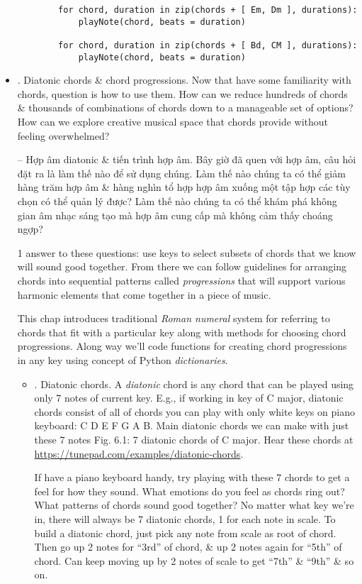 \documentclass{article}
\begin{document}
\begin{itemize}
\begin{verbatim}
		for chord, duration in zip(chords + [ Em, Dm ], durations):
		    playNote(chord, beats = duration)
		    
		for chord, duration in zip(chords + [ Bd, CM ], durations):
		    playNote(chord, beats = duration)
	\end{verbatim}
	\item {. Diatonic chords \& chord progressions.} Now that have some familiarity with chords, question is how to use them. How can we reduce hundreds of chords \& thousands of combinations of chords down to a manageable set of options? How can we explore creative musical space that chords provide without feeling overwhelmed?
	
	-- {\sf Hợp âm diatonic \& tiến trình hợp âm.} Bây giờ đã quen với hợp âm, câu hỏi đặt ra là làm thế nào để sử dụng chúng. Làm thế nào chúng ta có thể giảm hàng trăm hợp âm \& hàng nghìn tổ hợp hợp âm xuống một tập hợp các tùy chọn có thể quản lý được? Làm thế nào chúng ta có thể khám phá không gian âm nhạc sáng tạo mà hợp âm cung cấp mà không cảm thấy choáng ngợp?
	
	1 answer to these questions: use keys to select subsets of chords that we know will sound good together. From there we can follow guidelines for arranging chords into sequential patterns called {\it progressions} that will support various harmonic elements that come together in a piece of music.
	
	This chap introduces traditional {\it Roman numeral} system for referring to chords that fit with a particular key along with methods for choosing chord progressions. Along way we'll code functions for creating chord progressions in any key using concept of Python {\it dictionaries}.
	\begin{itemize}
		\item {. Diatonic chords.} A {\it diatonic} chord is any chord that can be played using only 7 notes of current key. E.g., if working in key of C major, diatonic chords consist of all of chords you can play with only white keys on piano keyboard: C D E F G A B. Main diatonic chords we can make with just these 7 notes {\sf Fig. 6.1: 7 diatonic chords of C major.} Hear these chords at \url{https://tunepad.com/examples/diatonic-chords}.
		
		If have a piano keyboard handy, try playing with these 7 chords to get a feel for how they sound. What emotions do you feel as chords ring out? What patterns of chords sound good together? No matter what key we're in, there will always be 7 diatonic chords, 1 for each note in scale. To build a diatonic chord, just pick any note from scale as root of chord. Then go up 2 notes for ``3rd'' of chord, \& up 2 notes again for ``5th'' of chord. Can keep moving up by 2 notes of scale to get ``7th'' \& ``9th'' \& so on.
		

\end{itemize}
\end{itemize}
\end{document}
